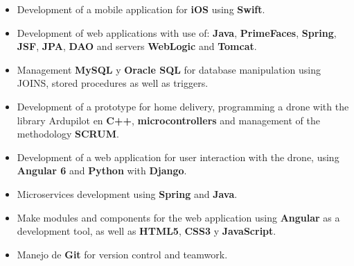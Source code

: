 \documentclass[letterpaper]{style} %
\begin{document}
\divider

\begin{itemize}
	\item Development of a mobile application for \textbf{iOS} using \textbf{Swift}.
	\item Development of web applications with use of: \textbf{Java}, \textbf{PrimeFaces}, \textbf{Spring}, \textbf{JSF}, \textbf{JPA}, \textbf{DAO}  and servers \textbf{WebLogic} and \textbf{Tomcat}.
	\item Management \textbf{MySQL} y \textbf{Oracle SQL} for database manipulation using JOINS, stored procedures as well as triggers.
\end{itemize}



\divider

\begin{itemize}
	\item Development of a prototype for home delivery, programming a drone with the library  Ardupilot en \textbf{C++}, \textbf{microcontrollers} and management of the methodology \textbf{SCRUM}.
	\item Development of a web application for user interaction with the drone, using  \textbf{Angular 6} and  \textbf{Python} with  \textbf{Django}.
\end{itemize}

\divider

\begin{itemize}
	\item Microservices development using \textbf{Spring} and \textbf{Java}.
	\item Make modules and components for the web application using \textbf{Angular} as a development tool, as well as \textbf{HTML5}, \textbf{CSS3} y \textbf{JavaScript}.
	\item Manejo de \textbf{Git} for version control and teamwork.
\end{itemize}
\end{document}
